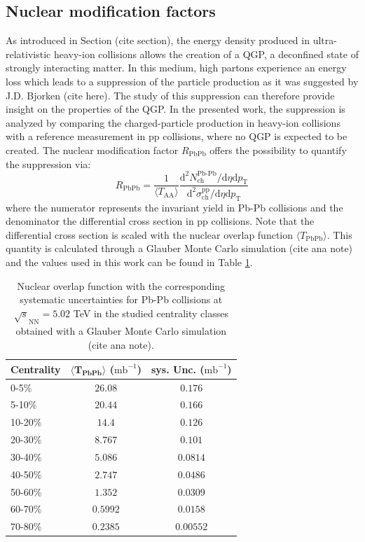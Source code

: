 \documentclass[12pt,a4paper]{report}
\begin{document}
\subsection{Nuclear modification factors}
As introduced in Section (cite section), the energy density produced in ultra-relativistic heavy-ion collisions  allows the creation of a QGP, a deconfined state of strongly interacting matter. In this medium, high \pt partons experience an energy loss which leads to a suppression of the particle production as it was suggested by J.D. Bjorken (cite here). The study of this suppression can therefore provide insight on the properties of the QGP. In the presented work, the suppression is analyzed by comparing the charged-particle production in heavy-ion collisions with a reference measurement in pp collisions, where no QGP is expected to be created. The nuclear modification factor $R_\text{PbPb} $ offers the possibility to quantify the suppression via:
\begin{equation}
R_\text{PbPb} = \dfrac{1}{\langle T_\text{AA}\rangle} \dfrac{\text{d}^2 N^\text{Pb-Pb}_\text{ch} / \text{d}\eta \text{d}p_\text{T}}{\text{d}^2 \sigma^\text{pp}_\text{ch} / \text{d}\eta \text{d}p_\text{T}}
\end{equation}
where the numerator represents the invariant yield in Pb-Pb collisions and the denominator the differential cross section in pp collisions. Note that the differential cross section is scaled with the nuclear overlap function $\langle T_\text{PbPb} \rangle$. This quantity is calculated through a Glauber Monte Carlo simulation (cite ana note) and the values used in this work can be found in Table \ref{tab:taa}.\\
\begin{table}[tb!]
\renewcommand{\arraystretch}{1.5}
\centering
\begin{tabular}{l c c}
\toprule
\rowcolor{headerBlue}  \textbf{Centrality} &  \textbf{$\mathbf{\langle T_\text{PbPb} \rangle}$ ($\text{mb}^{-1}$)}  &   \textbf{sys. Unc. } ($\text{mb}^{-1}$) \\
\midrule
\midrule
0-5\% & $26.08$  & $0.176$\\
5-10\% & $20.44$ & $0.166$\\
10-20\% & $14.4$ & $0.126$ \\
20-30\% & $8.767$ & $0.101$ \\
30-40\% & $5.086$ & $0.0814$ \\
40-50\% & $2.747$ & $0.0486$\\
50-60\% & $1.352$ & $0.0309$\\
60-70\% & $0.5992$ & $0.0158$\\
70-80\% & $0.2385$ & $0.00552$ \\
\bottomrule
\end{tabular}
\caption{Nuclear overlap function with the corresponding systematic uncertainties for Pb-Pb collisions at $\sqrt{s}_\text{NN}=5.02$ TeV in the studied centrality classes obtained with a Glauber Monte Carlo simulation (cite ana note).}
\label{tab:taa}
\end{table}
\end{document}
